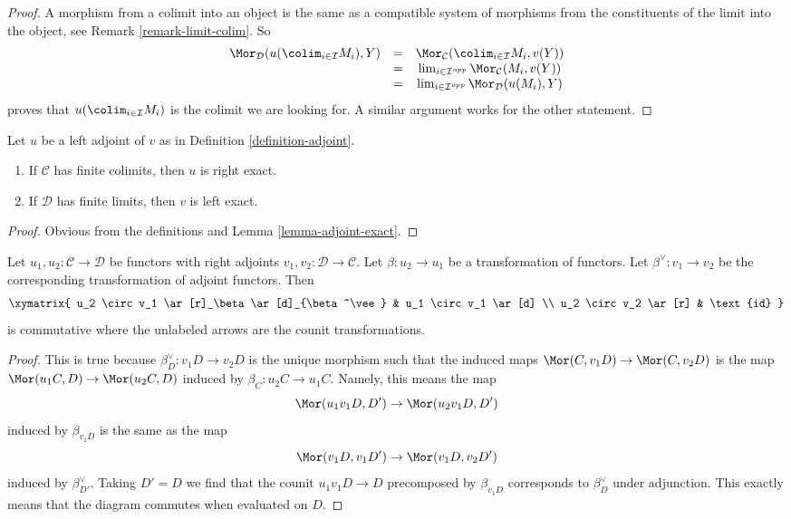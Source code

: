 \begin{proof}
A morphism from a colimit into an object is the same as a compatible
system of morphisms from the constituents of the limit into the
object, see Remark \ref{remark-limit-colim}. So
$$
\begin{matrix}
\Mor_\mathcal{D}(u(\colim_{i \in \mathcal{I}} M_i), Y) &
= & \Mor_\mathcal{C}(\colim_{i \in \mathcal{I}} M_i, v(Y)) \\
& = &
\lim_{i \in \mathcal{I}^{opp}}
\Mor_\mathcal{C}(M_i, v(Y)) \\
& = &
\lim_{i \in \mathcal{I}^{opp}}
\Mor_\mathcal{D}(u(M_i), Y)
\end{matrix}
$$
proves that $u(\colim_{i \in \mathcal{I}} M_i)$ is
the colimit we are looking for.
A similar argument works for the other statement.
\end{proof}

\begin{lemma}
\label{lemma-exact-adjoint}
Let $u$ be a left adjoint of $v$ as in Definition \ref{definition-adjoint}.
\begin{enumerate}
\item If $\mathcal{C}$ has finite colimits, then $u$ is right exact.
\item If $\mathcal{D}$ has finite limits, then $v$ is left exact.
\end{enumerate}
\end{lemma}

\begin{proof}
Obvious from the definitions and Lemma \ref{lemma-adjoint-exact}.
\end{proof}

\begin{lemma}
\label{lemma-transformation-between-functors-and-adjoints}
Let $u_1, u_2 : \mathcal{C} \to \mathcal{D}$ be functors with right
adjoints $v_1, v_2 : \mathcal{D} \to \mathcal{C}$. Let $\beta : u_2 \to u_1$
be a transformation of functors. Let $\beta^\vee : v_1 \to v_2$ be
the corresponding transformation of adjoint functors. Then
$$
\xymatrix{
u_2 \circ v_1 \ar[r]_\beta \ar[d]_{\beta^\vee} &
u_1 \circ v_1 \ar[d] \\
u_2 \circ v_2 \ar[r] & \text{id}
}
$$
is commutative where the unlabeled arrows are the counit transformations.
\end{lemma}

\begin{proof}
This is true because $\beta^\vee_D : v_1D \to v_2D$ is the unique
morphism such that the induced maps $\Mor(C, v_1D) \to \Mor(C, v_2D)$
is the map $\Mor(u_1C, D) \to \Mor(u_2C, D)$ induced by
$\beta_C : u_2C \to u_1C$. Namely, this means the map
$$
\Mor(u_1 v_1 D, D') \to \Mor(u_2 v_1 D, D')
$$
induced by $\beta_{v_1 D}$ is the same as the map
$$
\Mor(v_1 D, v_1 D') \to \Mor(v_1 D, v_2 D')
$$
induced by $\beta^\vee_{D'}$. Taking $D' = D$ we find that the counit
$u_1 v_1 D \to D$ precomposed by $\beta_{v_1D}$ corresponds to $\beta^\vee_D$
under adjunction. This exactly means that the diagram commutes when
evaluated on $D$.
\end{proof}

